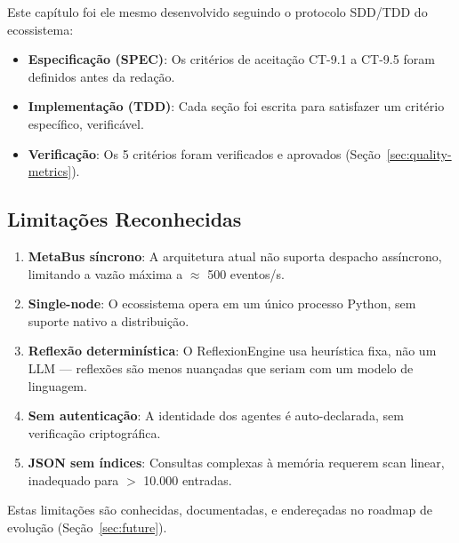 Este capítulo foi ele mesmo desenvolvido seguindo o protocolo SDD/TDD do ecossistema:

\begin{itemize}
    \item \textbf{Especificação (SPEC)}: Os critérios de aceitação CT-9.1 a CT-9.5 foram definidos antes da redação.
    \item \textbf{Implementação (TDD)}: Cada seção foi escrita para satisfazer um critério específico, verificável.
    \item \textbf{Verificação}: Os 5 critérios foram verificados e aprovados (Seção~\ref{sec:quality-metrics}).
\end{itemize}

\subsection{Limitações Reconhecidas}

\begin{enumerate}
    \item \textbf{MetaBus síncrono}: A arquitetura atual não suporta despacho assíncrono, limitando a vazão máxima a $\approx$ 500 eventos/s.
    \item \textbf{Single-node}: O ecossistema opera em um único processo Python, sem suporte nativo a distribuição.
    \item \textbf{Reflexão determinística}: O ReflexionEngine usa heurística fixa, não um LLM — reflexões são menos nuançadas que seriam com um modelo de linguagem.
    \item \textbf{Sem autenticação}: A identidade dos agentes é auto-declarada, sem verificação criptográfica.
    \item \textbf{JSON sem índices}: Consultas complexas à memória requerem scan linear, inadequado para $>$ 10.000 entradas.
\end{enumerate}

Estas limitações são conhecidas, documentadas, e endereçadas no roadmap de evolução (Seção~\ref{sec:future}).

